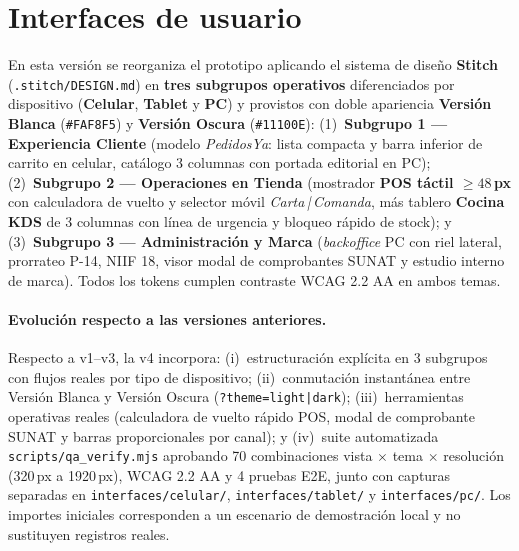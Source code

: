 
\FloatBarrier
\section{Interfaces de usuario}
\label{sec:interfaces}

\par\vspace{0.5em}

En esta versión se reorganiza el prototipo aplicando el sistema de diseño \textbf{Stitch} (\texttt{.stitch/DESIGN.md}) en \textbf{tres subgrupos operativos} diferenciados por dispositivo (\textbf{Celular}, \textbf{Tablet} y \textbf{PC}) y provistos con doble apariencia \textbf{Versión Blanca} (\texttt{\#FAF8F5}) y \textbf{Versión Oscura} (\texttt{\#11100E}): (1)~\textbf{Subgrupo 1 — Experiencia Cliente} (modelo \emph{PedidosYa}: lista compacta y barra inferior de carrito en celular, catálogo 3 columnas con portada editorial en PC); (2)~\textbf{Subgrupo 2 — Operaciones en Tienda} (mostrador \textbf{POS táctil $\ge 48$\,px} con calculadora de vuelto y selector móvil \emph{Carta\,|\,Comanda}, más tablero \textbf{Cocina KDS} de 3 columnas con línea de urgencia y bloqueo rápido de stock); y (3)~\textbf{Subgrupo 3 — Administración y Marca} (\emph{backoffice} PC con riel lateral, prorrateo P-14, NIIF 18, visor modal de comprobantes SUNAT y estudio interno de marca). Todos los tokens cumplen contraste WCAG 2.2 AA en ambos temas.

\paragraph{Evolución respecto a las versiones anteriores.} Respecto a v1--v3,
la v4 incorpora: (i)~estructuración explícita en 3 subgrupos con flujos reales por tipo de dispositivo; (ii)~conmutación instantánea entre Versión Blanca y Versión Oscura (\texttt{?theme=light|dark}); (iii)~herramientas operativas reales (calculadora de vuelto rápido POS, modal de comprobante SUNAT y barras proporcionales por canal); y (iv)~suite automatizada \texttt{scripts/qa\_verify.mjs} aprobando 70 combinaciones vista $\times$ tema $\times$ resolución (320\,px a 1920\,px), WCAG 2.2 AA y 4 pruebas E2E, junto con capturas separadas en \texttt{interfaces/celular/}, \texttt{interfaces/tablet/} y \texttt{interfaces/pc/}. Los importes iniciales corresponden a un escenario de demostración local y no sustituyen registros reales.

